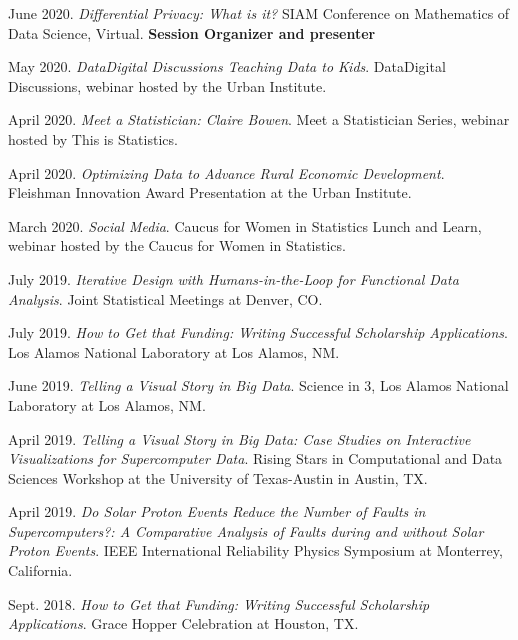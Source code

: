 \documentclass[11pt, letterpaper, roman]{moderncv} %
\begin{document}
\begin{etaremune}[topsep=0pt, itemsep=3pt, partopsep=0pt, parsep=0pt]
    \item June 2020. \textit{Differential Privacy: What is it?} SIAM Conference on Mathematics of Data Science, Virtual. \textbf{Session Organizer and presenter}
    
    \item May 2020. \textit{Data\@Urban Digital Discussions Teaching Data to Kids}. Data\@Urban Digital Discussions, webinar hosted by the Urban Institute.
    
    \item April 2020. \textit{Meet a Statistician: Claire Bowen}. Meet a Statistician Series, webinar hosted by This is Statistics.
    
    \item April 2020. \textit{Optimizing Data to Advance Rural Economic Development}. Fleishman Innovation Award Presentation at the Urban Institute.
    
    \item March 2020. \textit{Social Media}. Caucus for Women in Statistics Lunch and Learn, webinar hosted by the Caucus for Women in Statistics.
    
    \item July 2019. \textit{Iterative Design with Humans-in-the-Loop for Functional Data Analysis}. Joint Statistical Meetings at Denver, CO. 
    
    \item July 2019. \textit{How to Get that Funding: Writing Successful Scholarship Applications}. Los Alamos National Laboratory at Los Alamos, NM.
    
    \item June 2019. \textit{Telling a Visual Story in Big Data}. Science in 3, Los Alamos National Laboratory at Los Alamos, NM. 
    
    \item April 2019. \textit{Telling a Visual Story in Big Data: Case Studies on Interactive Visualizations for Supercomputer Data}. Rising Stars in Computational and Data Sciences Workshop at the University of Texas-Austin in Austin, TX.
    
    \item April 2019. \textit{Do Solar Proton Events Reduce the Number of Faults in Supercomputers?: A Comparative Analysis of Faults during and without Solar Proton Events}. IEEE International Reliability Physics Symposium at Monterrey, California.
    
    \item Sept. 2018. \textit{How to Get that Funding: Writing Successful Scholarship Applications}. Grace Hopper Celebration at Houston, TX.
    

\end{etaremune}
\end{document}
